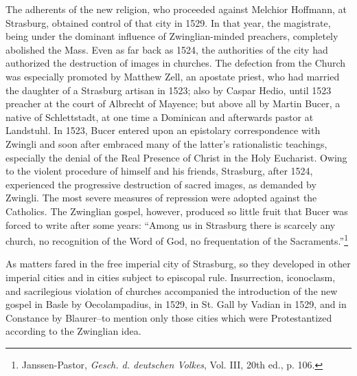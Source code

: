 The adherents of the new religion, who proceeded against Melchior
Hoffmann, at Strasburg, obtained control of that city in 1529. In
that year, the magistrate, being under the dominant influence of
Zwinglian-minded preachers, completely abolished the Mass. Even as
far back as 1524, the authorities of the city had authorized the destruction
of images in churches. The defection from the Church
was especially promoted by Matthew Zell, an apostate priest, who
had married the daughter of a Strasburg artisan in 1523; also by
Caspar Hedio, until 1523 preacher at the court of Albrecht of Mayence;
but above all by Martin Bucer, a native of Schlettstadt, at one
time a Dominican and afterwards pastor at Landstuhl. In 1523, Bucer entered
upon an epistolary correspondence with Zwingli and
soon after embraced many of the latter’s rationalistic teachings, especially
the denial of the Real Presence of Christ in the Holy Eucharist. Owing
to the violent procedure of himself and his friends, Strasburg,
after 1524, experienced the progressive destruction of sacred
images, as demanded by Zwingli. The most severe measures of repression
were adopted against the Catholics. The Zwinglian gospel, however,
produced so little fruit that Bucer was forced to write after
some years: “Among us in Strasburg there is scarcely any church, no
recognition of the Word of God, no frequentation of the Sacraments.”\footnote
{Janssen-Pastor, \textit{Gesch. d. deutschen Volkes}, Vol. III, 20th ed., p. 106.}

As matters fared in the free imperial city of Strasburg, so they
developed in other imperial cities and in cities subject to episcopal
rule. Insurrection, iconoclasm, and sacrilegious violation of churches
accompanied the introduction of the new gospel in Basle by Oecolampadius,
in 1529, in St. Gall by Vadian in 1529, and in Constance
by Blaurer--to mention only those cities which were Protestantized
according to the Zwinglian idea.

